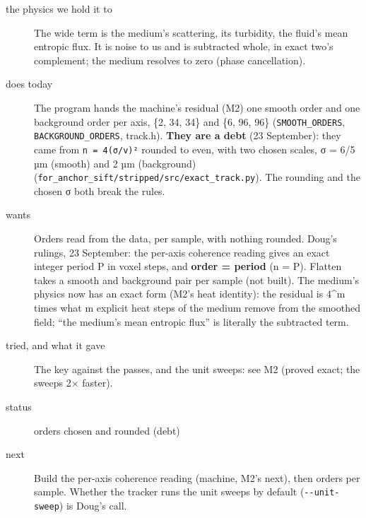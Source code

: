 \begin{description}
\item[{the physics we hold it to}] The wide term is the medium's scattering, its turbidity, the fluid's mean entropic flux. It is noise to us and is subtracted whole, in exact two's complement; the medium resolves to zero (phase cancellation).
\item[{does today}] The program hands the machine's residual (M2) one smooth order and one background order per axis, \{2, 34, 34\} and \{6, 96, 96\} (\texttt{SMOOTH\_\allowbreak{}ORDERS}, \texttt{BACKGROUND\_\allowbreak{}ORDERS}, track.h). \textbf{They are a debt} (23 September): they came from \texttt{n = 4(σ/\allowbreak{}v)²} rounded to even, with two chosen scales, σ = 6/5 µm (smooth) and 2 µm (background) (\texttt{for\_\allowbreak{}anchor\_\allowbreak{}sift/\allowbreak{}stripped/\allowbreak{}src/\allowbreak{}exact\_\allowbreak{}track.\allowbreak{}py}). The rounding and the chosen σ both break the rules.
\item[{wants}] Orders read from the data, per sample, with nothing rounded. Doug's rulings, 23 September: the per-axis coherence reading gives an exact integer period P in voxel steps, and \textbf{order = period} (n = P). Flatten takes a smooth and background pair per sample (not built). The medium's physics now has an exact form (M2's heat identity): the residual is 4\textasciicircum{}m times what m explicit heat steps of the medium remove from the smoothed field; “the medium's mean entropic flux” is literally the subtracted term.
\item[{tried, and what it gave}] The key against the passes, and the unit sweeps: see M2 (proved exact; the sweeps 2× faster).
\item[{status}] orders chosen and rounded (debt)
\item[{next}] Build the per-axis coherence reading (machine, M2's next), then orders per sample. Whether the tracker runs the unit sweeps by default (\texttt{-\allowbreak{}-\allowbreak{}unit-\allowbreak{}sweep}) is Doug's call.
\end{description}

